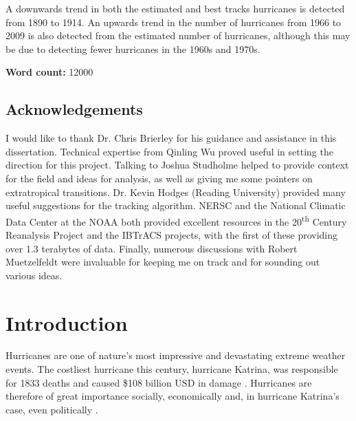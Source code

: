 \documentclass[pdftex,12pt,a4paper]{report}
\newcommand{\ts}{\textsuperscript}
\begin{document}
A downwards trend in both the estimated and best tracks hurricanes is detected from 1890 to 1914. An
upwards trend in the number of hurricanes from 1966 to 2009 is also detected from the estimated
number of hurricanes, although this may be due to detecting fewer hurricanes in the 1960s and 1970s.

\begin{center}
\textbf{Word count:} 12000 %
\end{center}

\newpage
\section*{Acknowledgements}

I would like to thank Dr. Chris Brierley for his guidance and assistance in this dissertation.
Technical expertise from Qinling Wu proved useful in setting the direction for this project.
Talking to Joshua Studholme helped to provide context for the field and ideas for analysis, as well
as giving me some pointers on extratropical transitions.
Dr. Kevin Hodges (Reading University) provided many useful suggestions for the tracking algorithm.
NERSC and the National Climatic Data Center at the NOAA both provided excellent resources in the
20\ts{th} Century Reanalysis Project and the IBTrACS projects, with the first of these providing
over 1.3 terabytes of data.
Finally, numerous discussions with Robert Muetzelfeldt were invaluable for keeping me on track and
for sounding out various ideas.

\newpage

\tableofcontents

\chapter{Introduction}


Hurricanes are one of nature's most impressive and devastating extreme weather events. The costliest
hurricane this century, hurricane Katrina, was responsible for 1833 deaths and caused \$108
billion USD in damage \parencite{knabb2006tropical}.
Hurricanes are therefore of great importance socially,
economically and, in hurricane Katrina's case, even politically \parencite{kellner2007katrina}.
\end{document}
